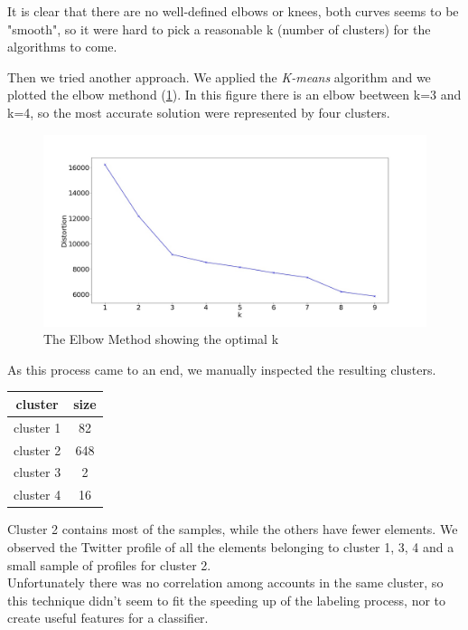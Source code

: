 It is clear that there are no well-defined elbows or knees, both curves seems to be "smooth", so it were hard to pick a reasonable k (number of clusters) for the algorithms to come.


Then we tried another approach. We applied the \textit{K-means} algorithm and we plotted the elbow methond (\ref{fig:elbow}). In this figure there is an elbow beetween k=3 and k=4, so the most accurate solution were represented by four clusters.

\begin{figure}
	\includegraphics[width=\linewidth]{chapter3/figure/elbow.jpg}
	\caption{The Elbow Method showing the optimal k}
	\label{fig:elbow}
\end{figure}

As this process came to an end, we manually inspected the resulting clusters.

\begin{center}
	\begin{tabular}{cc}
	\\cluster&size\\
	\hline\hline
	cluster 1&82\\
	cluster 2&648\\
	cluster 3&2\\
	cluster 4&16\\\hline
	\end{tabular}
\end{center}

Cluster 2 contains most of the samples, while the others have fewer elements.
We observed the Twitter profile of all the elements belonging to cluster 1, 3, 4 and a small sample of profiles for cluster 2.\\
Unfortunately there was no correlation among accounts in the same cluster, so this technique didn't seem to fit the speeding up of the labeling process, nor to create useful features for a classifier.


